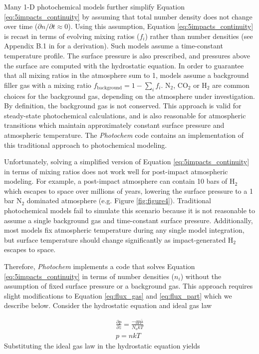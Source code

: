 Many 1-D photochemical models further simplify Equation \eqref{eq:5impacts_continuity} by assuming that total number density does not change over time ($\partial n / \partial t \approx 0$). Using this assumption, Equation \eqref{eq:5impacts_continuity} is recast in terms of evolving mixing ratios ($f_i$) rather than number densities (see Appendix B.1 in \citet{Catling_2017} for a derivation). Such models assume a time-constant temperature profile. The surface pressure is also prescribed, and pressures above the surface are computed with the hydrostatic equation. In order to guarantee that all mixing ratios in the atmosphere sum to 1, models assume a background filler gas with a mixing ratio $f_\mathrm{background} = 1 - \sum_i f_i$. N$_2$, CO$_2$ or H$_2$ are common choices for the background gas, depending on the atmosphere under investigation. By definition, the background gas is not conserved. This approach is valid for steady-state photochemical calculations, and is also reasonable for atmospheric transitions which maintain approximately constant surface pressure and atmospheric temperature. The \emph{Photochem} code contains an implementation of this traditional approach to photochemical modeling.

Unfortunately, solving a simplified version of Equation \eqref{eq:5impacts_continuity} in terms of mixing ratios does not work well for post-impact atmospheric modeling. For example, a post-impact atmosphere can contain 10 bars of H$_2$ which escapes to space over millions of years, lowering the surface pressure to a 1 bar N$_2$ dominated atmosphere (e.g. Figure \ref{fig:figure4}). Traditional photochemical models fail to simulate this scenario because it is not reasonable to assume a single background gas and time-constant surface pressure. Additionally, most models fix atmospheric temperature during any single model integration, but surface temperature should change significantly as impact-generated H$_2$ escapes to space.

Therefore, \emph{Photochem} implements a code that solves
Equation \eqref{eq:5impacts_continuity} in terms of number densities ($n_i$) without the assumption of fixed surface pressure or a background gas. This approach requires slight modifications to Equation \eqref{eq:flux_gas} and \eqref{eq:flux_part} which we describe below. Consider the hydrostatic equation and ideal gas law

\begin{gather}
  \frac{\partial p}{\partial z} = \frac{-g p \bar \mu}{N_a k T} \\
  p = n k T
\end{gather}
Substituting the ideal gas law in  the hydrostatic equation yields

